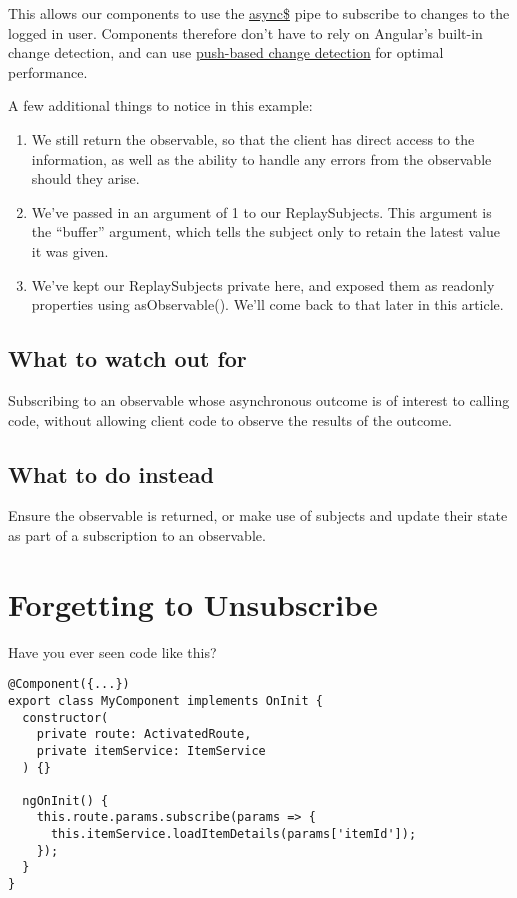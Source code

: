This allows our components to use the \href{https://angular.io/api/common/AsyncPipe}{async\$} pipe to subscribe to changes to the logged in user. Components therefore don’t have to rely on Angular’s built-in change detection, and can use \href{https://blog.angular-university.io/onpush-change-detection-how-it-works/}{push-based change detection} for optimal performance.

A few additional things to notice in this example:

\begin{enumerate}
  \item We still return the observable, so that the client has direct access to the information, as well as the ability to handle any errors from the observable should they arise.
  \item We’ve passed in an argument of 1 to our ReplaySubjects. This argument is the “buffer” argument, which tells the subject only to retain the latest value it was given.
  \item We’ve kept our ReplaySubjects private here, and exposed them as readonly properties using asObservable(). We’ll come back to that later in this article.
\end{enumerate}

\subsection{What to watch out for}
Subscribing to an observable whose asynchronous outcome is of interest to calling code, without allowing client code to observe the results of the outcome.

\subsection{What to do instead}
Ensure the observable is returned, or make use of subjects and update their state as part of a subscription to an observable.

\section{Forgetting to Unsubscribe}
Have you ever seen code like this?
\begin{lstlisting}
@Component({...})
export class MyComponent implements OnInit {
  constructor(
    private route: ActivatedRoute,
    private itemService: ItemService
  ) {}

  ngOnInit() {
    this.route.params.subscribe(params => {
      this.itemService.loadItemDetails(params['itemId']);
    });
  }
}  
\end{lstlisting}

